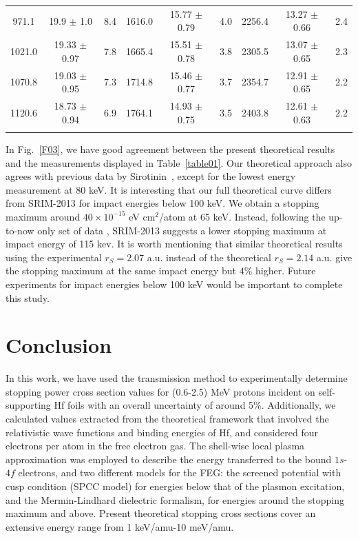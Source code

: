 \documentclass[aps,pra,reprint,groupedaddress,showpacs,showkeys]{revtex4-1}
\begin{document}
\begin{table}[!t]
\begin{ruledtabular}
\begin{tabular}{ccc|ccc|ccc}
971.1	 & 19.9	$\pm$	1.0	&	8.4	&	1616.0	&	15.77	$\pm$	0.79	&	4.0	&	2256.4	&	13.27	$\pm$	0.66	&	2.4	\\
1021.0 & 19.33	$\pm$	0.97	&	7.8	&	1665.4	&	15.51	$\pm$	0.78	&	3.8	&	2305.5	&	13.07	$\pm$	0.65	&	2.3	\\
1070.8 & 19.03	$\pm$	0.95	&	7.3	&	1714.8	&	15.46	$\pm$	0.77	&	3.7	&	2354.7	&	12.91	$\pm$	0.65	&	2.2	\\
1120.6 & 18.73	$\pm$	0.94	&	6.9	&	1764.1	&	14.93	$\pm$	0.75	&	3.5	&	2403.8	&	12.61	$\pm$	0.63	&	2.2	\\ \\ 
\end{tabular}
\end{ruledtabular}
\end{table}

In Fig.~\ref{F03}, we have good agreement between the present 
theoretical results and the measurements displayed in Table~\ref{table01}. 
Our theoretical approach also agrees with previous data by 
Sirotinin~\cite{Sirotinin}, except for the lowest energy measurement at 
80 keV. It is interesting that our full theoretical curve differs from 
SRIM-2013 for impact energies below 100 keV. We obtain a stopping 
maximum around $40 \times 10^{-15}$ eV cm$^2$/atom  at 65 keV. Instead, 
following the up-to-now only set of data \cite{Sirotinin}, SRIM-2013 
suggests a lower stopping maximum  at impact energy of 115 kev. It is 
worth mentioning that similar theoretical results using the experimental 
$r_S=2.07$ a.u. instead of the theoretical $r_S=2.14$ a.u. give the 
stopping maximum at the same impact energy but $4\%$ higher. Future 
experiments for impact energies below 100 keV would be important to 
complete this study.

\section{Conclusion}
\label{conclusion}

In this work, we have used the transmission method to experimentally 
determine stopping power cross section values for (0.6-2.5) MeV protons 
incident on self-supporting Hf foils with an overall uncertainty of 
around 5\%. Additionally, we calculated values extracted from the 
theoretical framework that involved the relativistic wave functions and 
binding energies of Hf, and considered four electrons per atom in the free 
electron gas. The shell-wise local plasma approximation was employed to 
describe the energy transferred to the bound $1s$-$4f$ electrons, and 
two different models for the FEG: the screened potential with cusp 
condition (SPCC model) for energies below that of the plasmon 
excitation, and the Mermin-Lindhard dielectric formalism, for energies 
around the stopping maximum and above. Present theoretical stopping 
cross sections cover an extensive energy range from 1 keV/amu-10 meV/amu.
\end{document}

